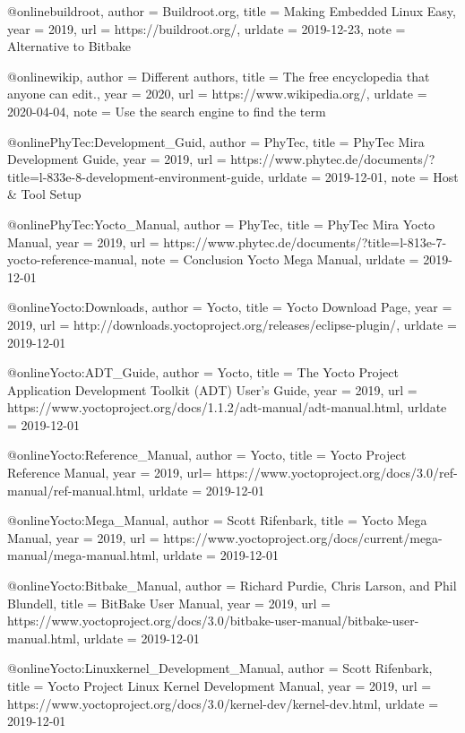@online{buildroot,
author = {Buildroot.org},
title = {Making Embedded Linux Easy},
year = 2019,
url =  {https://buildroot.org/},
urldate = {2019-12-23},
note = {Alternative to Bitbake}
}

@online{wikip,
author = {Different authors},
title = {The free encyclopedia that anyone can edit.},
year = 2020,
url = {https://www.wikipedia.org/},
urldate = {2020-04-04},
note = {Use the search engine to find the term}
}

@online{PhyTec:Development_Guid,
author = {PhyTec},
title = {{PhyTec Mira} Development Guide},
year = 2019,
url = {https://www.phytec.de/documents/?title=l-833e-8-development-environment-guide},
urldate = {2019-12-01},
note = {Host \& Tool Setup}
}


@online{PhyTec:Yocto_Manual,
author = {PhyTec},
title = {{PhyTec Mira} Yocto Manual},
year = 2019,
url = {https://www.phytec.de/documents/?title=l-813e-7-yocto-reference-manual},
note = {Conclusion Yocto Mega Manual},
urldate = {2019-12-01}
}



@online{Yocto:Downloads,
author = {Yocto},
title = {{Yocto} Download Page},
year = 2019,
url = {http://downloads.yoctoproject.org/releases/eclipse-plugin/},
urldate = {2019-12-01}
}


@online{Yocto:ADT_Guide,
author = {Yocto},
title = {The Yocto Project Application Development Toolkit (ADT) User's Guide},
year = 2019,
url = {https://www.yoctoproject.org/docs/1.1.2/adt-manual/adt-manual.html},
urldate = {2019-12-01}
}


@online{Yocto:Reference_Manual,
author = {Yocto},
title = {Yocto Project Reference Manual},
year = 2019,
url= {https://www.yoctoproject.org/docs/3.0/ref-manual/ref-manual.html},
urldate = {2019-12-01}
}


@online{Yocto:Mega_Manual,
author = {Scott Rifenbark},
title = {Yocto Mega Manual},
year = 2019,
url = {https://www.yoctoproject.org/docs/current/mega-manual/mega-manual.html},
urldate = {2019-12-01}
}


@online{Yocto:Bitbake_Manual,
author = {Richard Purdie, Chris Larson, and Phil Blundell},
title = {BitBake User Manual},
year = 2019,
url = {https://www.yoctoproject.org/docs/3.0/bitbake-user-manual/bitbake-user-manual.html},
urldate = {2019-12-01}
}

@online{Yocto:Linuxkernel_Development_Manual,
author = {Scott Rifenbark},
title = {Yocto Project Linux Kernel Development Manual},
year = 2019,
url = {https://www.yoctoproject.org/docs/3.0/kernel-dev/kernel-dev.html},
urldate = {2019-12-01}
}


